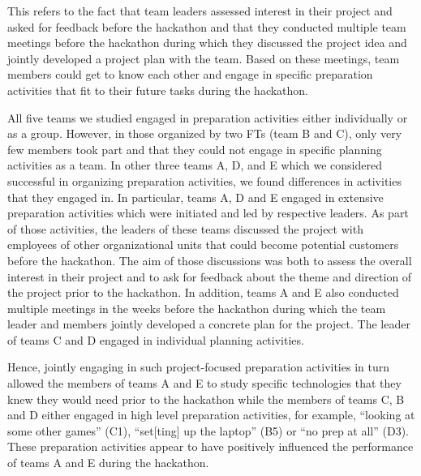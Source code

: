 \documentclass{hcij}
\begin{document}
This refers to the fact that team leaders assessed interest in their project and asked for feedback before the hackathon and that they conducted multiple team meetings before the hackathon during which they discussed the project idea and jointly developed a project plan with the team. Based on these meetings, team members could get to know each other and engage in specific preparation activities that fit to their future tasks during the hackathon.

All five teams we studied engaged in preparation activities either individually or as a group. However, in those organized by two FTs (team B and C), only very few members took part and that they could not engage in specific planning activities as a team. In other three teams A, D, and E which we considered successful in organizing preparation activities, we found differences in activities that they engaged in. In particular, teams A, D and E engaged in extensive preparation activities which were initiated and led by respective leaders. As part of those activities, the leaders of these teams discussed the project with employees of other organizational units that could become potential customers before the hackathon. The aim of those discussions was both to assess the overall interest in their project and to ask for feedback about the theme and direction of the project prior to the hackathon. In addition, teams A and E also conducted multiple meetings in the weeks before the hackathon during which the team leader and members jointly developed a concrete plan for the project. The leader of teams C and D engaged in individual planning activities.

Hence, jointly engaging in such project-focused preparation activities in turn allowed the members of teams A and E to study specific technologies that they knew they would need prior to the hackathon while the members of teams C, B and D either engaged in high level preparation activities, for example, “looking at some other games” (C1), “set[ting] up the laptop” (B5) or “no prep at all” (D3). These preparation activities appear to have positively influenced the performance of teams A and E during the hackathon.
\end{document}
